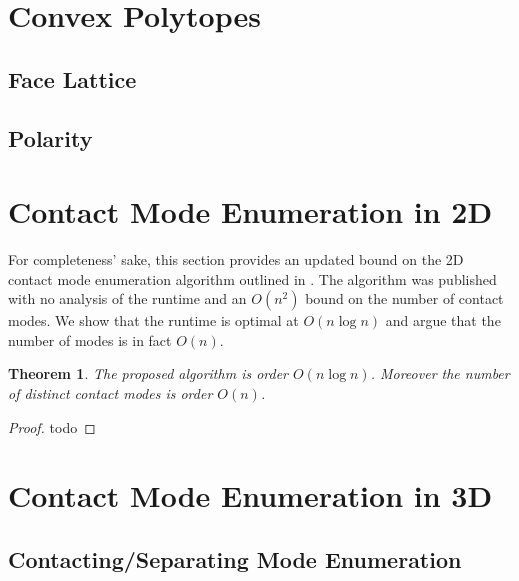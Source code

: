 \documentclass[conference]{IEEEtran}
\newtheorem{theorem}{Theorem}
\begin{document}
\section{Convex Polytopes}

\subsection{Face Lattice}

\subsection{Polarity}

\section{Contact Mode Enumeration in 2D}

For completeness' sake, this section provides an updated bound on the 2D contact
mode enumeration algorithm outlined in \citet{Mason}. The algorithm was
published with no analysis of the runtime and an $O(n^2)$ bound on the number of
contact modes. We show that the runtime is optimal at $O(n\log n)$ and argue
that the number of modes is in fact $O(n)$. 

\begin{theorem}
    The proposed algorithm is order $O(n\log n)$. Moreover the number of
    distinct contact modes is order $O(n)$.
\end{theorem}

\begin{proof}
    todo
\end{proof}

\section{Contact Mode Enumeration in 3D}

\subsection{Contacting/Separating Mode Enumeration}
\end{document}

